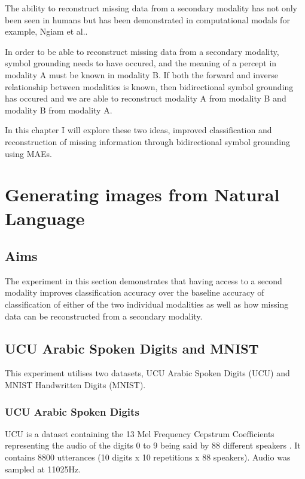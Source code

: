The ability to reconstruct missing data from a secondary modality has not only been seen in humans \cite{ma2009lip, samuel1997lexical} but has been demonstrated in computational modals for example, Ngiam et al.\cite{ngiam2011multimodal}.

In order to be able to reconstruct missing data from a secondary modality, symbol grounding needs to have occured, and the meaning of a percept in modality A must be known in modality B.
If both the forward and inverse relationship between modalities is known, then bidirectional symbol grounding has occured and we are able to reconstruct modality A from modality B and modality B from modality A.

In this chapter I will explore these two ideas, improved classification and reconstruction of missing information through  bidirectional symbol grounding using \acp{MAE}.



\section{Generating images from Natural Language}
\subsection{Aims}
The experiment in this section demonstrates that having access to a second modality improves classification accuracy over the baseline accuracy of classification of either of the two individual modalities as well as how missing data can be reconstructed from a secondary modality.

\subsection{UCU Arabic Spoken Digits and MNIST} 
\label{sec:UCU}
This experiment utilises two datasets, UCU Arabic Spoken Digits (UCU) and MNIST Handwritten Digits (MNIST).

\subsubsection{UCU Arabic Spoken Digits}
UCU is a dataset containing the 13 Mel Frequency Cepstrum Coefficients representing the audio of the digits 0 to 9 being said by 88 different speakers \cite{hammami2009tree,hammami2010improved}. It contains 8800 utterances (10 digits x 10 repetitions x 88 speakers). Audio was sampled at 11025Hz.

